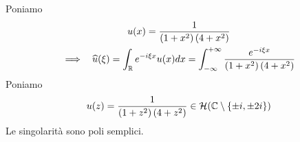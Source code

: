 Poniamo
\begin{gather*}
u(x) = \frac{1}{\left(1 + x^{2}\right)\left(4 + x^{2}\right)}\\
\implies \ \ \hat{u}(\xi) = \int _{\RR } e^{ - i\xi x} u(x) dx = \int ^{ + \infty }_{ - \infty }\frac{e^{ - i\xi x}}{\left(1 + x^{2}\right)\left(4 + x^{2}\right)}
\end{gather*}
Poniamo
\begin{equation*}
u(z) = \frac{1}{\left(1 + z^{2}\right)\left(4 + z^{2}\right)} \in \Hc (\CC  \setminus \{\pm i,\pm 2i\})
\end{equation*}
Le singolarità sono poli semplici.


\begin{figure}[htpb]
	\centering
{} %

\begin{tikzpicture}[x = 0.75pt,y = 0.75pt,yscale = -1,xscale = 1]


\end{tikzpicture}
\end{figure}

